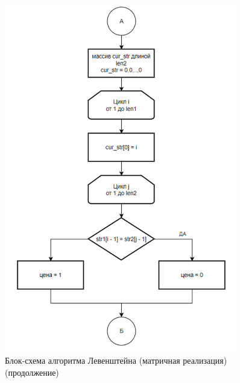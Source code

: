 \begin{figure}[H]
    \centering
    \includegraphics[width=0.9\textwidth]{img/block_1_1_2.png}
    \caption{Блок-схема алгоритма Левенштейна (матричная реализация) (продолжение)}
\end{figure}

